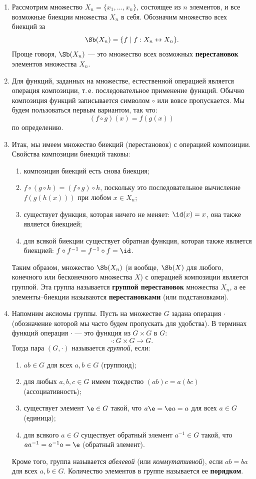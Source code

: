 \begin{enumerate}
\item Рассмотрим множество $X_n=\{x_1,\dots,x_n\}$, состоящее из $n$ элементов, и все возможные биекции множества $X_n$ в себя. Обозначим множество всех биекций за
$$
\Sb(X_n) = \{f\mid f:X_n\leftrightarrow X_n\}.
$$
Проще говоря, $\Sb(X_n)$ --- это множество всех возможных \textbf{перестановок} элементов множества $X_n$.
\item Для функций, заданных на множестве, естественной операцией является операция композиции, т.\,е. последовательное применение функций. Обычно композиция функций записывается символом $\circ$ или вовсе пропускается. Мы будем пользоваться первым вариантом, так что:
$$
(f\circ g)(x) = f(g(x))
$$
по определению.
\item Итак, мы имеем множество биекций (перестановок) с операцией композиции. Свойства композиции биекций таковы:
\begin{enumerate}[1.]
\item композиция биекций есть снова биекция;
\item $f\circ (g\circ h) = (f\circ g)\circ h$, поскольку это последовательное вычисление $f(g(h(x)))$ при любом $x\in X_n$;
\item существует функция, которая ничего не меняет: $\id(x)=x$, она также является биекцией;
\item для всякой биекции существует обратная функция, которая также является биекцией: $f\circ f^{-1}=f^{-1}\circ f=\id$.
\end{enumerate}

Таким образом, множество $\Sb(X_n)$ (и вообще, $\Sb(X)$ для любого, конечного или бесконечного множества $X$) с операцией композиции является группой. Эта группа называется \textbf{группой перестановок} множества $X_n$, а ее элементы--биекции называются \textbf{перестановками} (или подстановками).


\item Напомним аксиомы группы.
Пусть на множестве $G$ задана операция $\cdot$ (обозначение которой мы часто будем пропускать для удобства). В терминах функций операция $\cdot$ --- это функция из $G\times G$ в $G$:
$$
\cdot: G\times G\to G.
$$
Тогда пара $(G,\cdot)$ называется \textit{группой}, если:
\begin{enumerate}[G1]
\item $ab\in G$ для всех $a,b\in G$ (группоид);
\item для любых $a,b,c\in G$ имеем тождество $(ab)c=a(bc)$ (ассоциативность);
\item существует элемент $\e\in G$ такой, что $a\e=\e a=a$ для всех $a\in G$ (единица);
\item для всякого $a\in G$ существует обратный элемент $a^{-1}\in G$ такой, что $aa^{-1}=a^{-1}a=\e$ (обратный элемент).
\end{enumerate}
Кроме того, группа называется \textit{абелевой} (или \textit{коммутативной}), если $ab=ba$ для всех $a,b\in G$. Количество элементов в группе называется ее \textbf{порядком}.


\end{enumerate}
